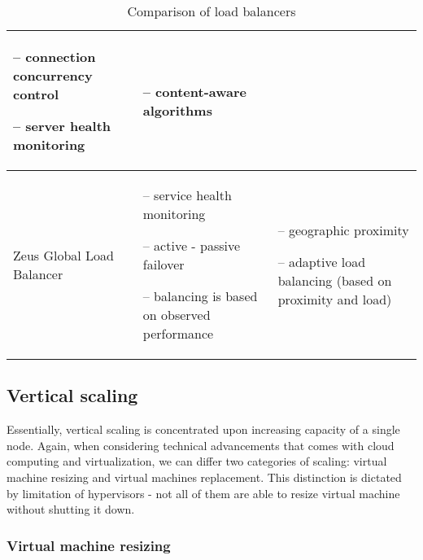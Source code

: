 \begin{table}[!htbp]
\begin{tabularx}{\textwidth}[]{ X  X  X }
-- connection concurrency control

-- server health monitoring

& 
-- content-aware algorithms
\\ \hline

Zeus Global Load Balancer \cite{ZeusGlobal} & 

-- service health monitoring

-- active - passive failover

-- balancing is based on observed performance

& 
-- geographic proximity

-- adaptive load balancing (based on proximity and load)

\\ \hline

\end{tabularx}

\caption{Comparison of load balancers}
\label{tab:load-balancer-comparison}

\end{table}

\newpage
\subsection{Vertical scaling}
Essentially, vertical scaling is concentrated upon increasing capacity of a single node. Again, when considering technical advancements that comes with cloud computing and virtualization, we can differ two categories of scaling: virtual machine resizing and virtual machines replacement. This distinction is dictated by limitation of hypervisors - not all of them are able to resize virtual machine without shutting it down.

\subsubsection{Virtual machine resizing}


